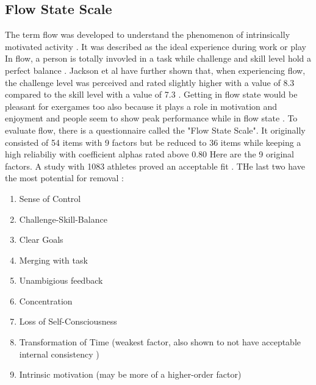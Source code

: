 \subsection{Flow State Scale}
The term flow was developed to understand the phenomenon of intrinsically motivated activity \cite{nakamura02concept}. It was described as the ideal experience during work or play \cite{csikszentmihalyi1992optimal} In flow, a person is totally invovled in a task while challenge and skill level hold a perfect balance \cite{jackson1998psychological}. Jackson et al have further shown that, when experiencing flow, the challenge level was perceived and rated slightly higher with a value of 8.3 compared to the skill level with a value of 7.3 \cite{jackson1996development}. Getting in flow state would be pleasant for exergames too also because it plays a role in motivation and enjoyment and people seem to show peak performance while in flow state \cite{jackson1996development, harris20review}.
To evaluate flow, there is a questionnaire called the "Flow State Scale". It originally consisted of 54 items with 9 factors but be reduced to 36 items while keeping a high reliabiliy with coefficient alphas rated above 0.80 \cite{jackson1996development} 
Here are the 9 original factors. A study with 1083 athletes proved an acceptable fit \cite{stavrou11confirmatory}. THe last two have the most potential for removal \cite{jackson1996development}:
\begin{enumerate}
	\item Sense of Control
	\item Challenge-Skill-Balance
	\item Clear Goals
	\item Merging with task
	\item Unambigious feedback
	\item Concentration
	\item Loss of Self-Consciousness
	\item Transformation of Time (weakest factor, also shown to not have acceptable internal consistency \cite{vlachopoulus00confirmatory})
	\item Intrinsic motivation (may be more of a higher-order factor)
\end{enumerate}

